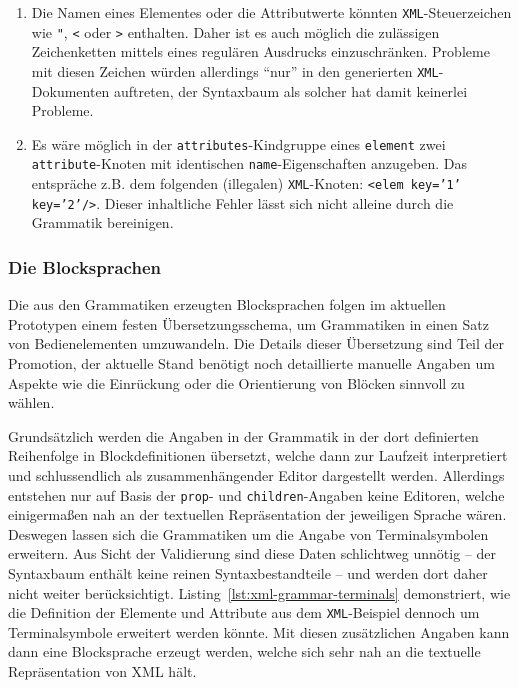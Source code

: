 \documentclass[paper=a4,fontsize=11pt,parskip=half]{scrartcl}
\begin{document}
\begin{enumerate}
\item Die Namen eines Elementes oder die Attributwerte könnten \texttt{XML}-Steuerzeichen wie \texttt{"}, \texttt{<} oder \texttt{>} enthalten. Daher ist es auch möglich die zulässigen Zeichenketten mittels eines regulären Ausdrucks einzuschränken. Probleme mit diesen Zeichen würden allerdings \enquote{nur} in den generierten \texttt{XML}-Dokumenten auftreten, der Syntaxbaum als solcher hat damit keinerlei Probleme.
\item Es wäre möglich in der \texttt{attributes}-Kindgruppe eines \texttt{element} zwei \texttt{attribute}-Knoten mit identischen \texttt{name}-Eigenschaften anzugeben. Das entspräche z.B. dem folgenden (illegalen) \texttt{XML}-Knoten: \texttt{<elem key='1' key='2'/>}. Dieser inhaltliche Fehler lässt sich nicht alleine durch die Grammatik bereinigen.
\end{enumerate}

\subsubsection{Die Blocksprachen}

Die aus den Grammatiken erzeugten Blocksprachen folgen im aktuellen Prototypen einem festen Übersetzungsschema, um Grammatiken in einen Satz von Bedienelementen umzuwandeln. Die Details dieser Übersetzung sind Teil der Promotion, der aktuelle Stand benötigt noch detaillierte manuelle Angaben um Aspekte wie die Einrückung oder die Orientierung von Blöcken sinnvoll zu wählen.

Grundsätzlich werden die Angaben in der Grammatik in der dort definierten Reihenfolge in Blockdefinitionen übersetzt, welche dann zur Laufzeit interpretiert und schlussendlich als zusammenhängender Editor dargestellt werden. Allerdings entstehen nur auf Basis der \texttt{prop}- und \texttt{children}-Angaben keine Editoren, welche einigermaßen nah an der textuellen Repräsentation der jeweiligen Sprache wären. Deswegen lassen sich die Grammatiken um die Angabe von Terminalsymbolen erweitern. Aus Sicht der Validierung sind diese Daten schlichtweg unnötig -- der Syntaxbaum enthält keine reinen Syntaxbestandteile -- und werden dort daher nicht weiter berücksichtigt. Listing~\ref{lst:xml-grammar-terminals} demonstriert, wie die Definition der Elemente und Attribute aus dem \texttt{XML}-Beispiel dennoch um Terminalsymbole erweitert werden könnte. Mit diesen zusätzlichen Angaben kann dann eine Blocksprache erzeugt werden, welche sich sehr nah an die textuelle Repräsentation von XML hält.
\end{document}

